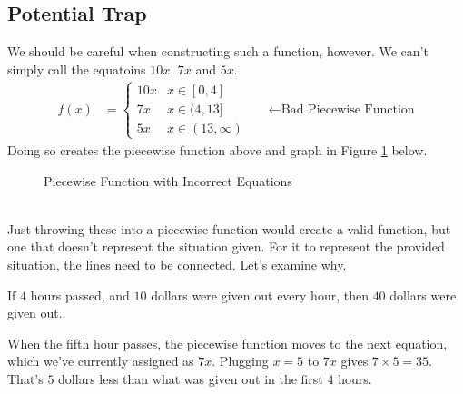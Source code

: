\subsection{Potential Trap}
We should be careful when constructing such a function, however. We can't simply call the equatoins $10x$, $7x$ and $5x$. 
\begin{align*}
f(x) &= 
\begin{cases}
    10x & x \in [0, 4]\\
    7x & x \in (4, 13] \\
    5x & x \in (13, \infty)
\end{cases}
&& \longleftarrow \text{Bad Piecewise Function}
\end{align*}
Doing so creates the piecewise function above and graph in Figure \ref{fig:Bad Piecewise Example 1} below.
\begin{figure}[ht]
    \centering
    \caption{Piecewise Function with Incorrect Equations}
    \label{fig:Bad Piecewise Example 1}
\end{figure}
\\
Just throwing these into a piecewise function would create a valid function, but one that doesn't represent the situation given. For it to represent the provided situation, the lines need to be connected. Let's examine why.

If $4$ hours passed, and $10$ dollars were given out every hour, then $40$ dollars were given out.

When the fifth hour passes, the piecewise function moves to the next equation, which we've currently assigned as $7x$. Plugging $x = 5$ to $7x$ gives $7 \times 5 = 35$. That's $5$ dollars less than what was given out in the first $4$ hours.

